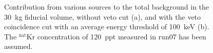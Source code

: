 \begin{figure}[!h]
\centering
{}
\caption[Contribution from various sources to the total background in the 30~kg fiducial volume]{Contribution from various sources to the total background in the 30~kg fiducial volume, without veto cut (a), and with the veto coincidence cut with an average energy threshold of 100~keV (b). The $^{\mathrm{nat}}$Kr concentration of 120~ppt measured in run07 has been assumed.}
\label{figPies}
\end{figure}


